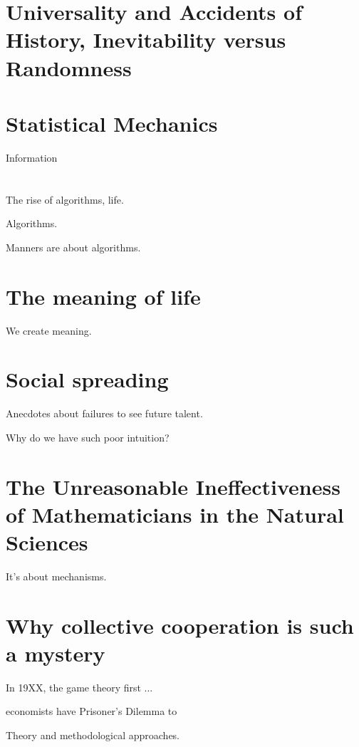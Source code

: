 \section{Universality and Accidents of History, Inevitability versus Randomness}

\section{Statistical Mechanics}


Information

\section{}

The rise of algorithms, life.

Algorithms.

Manners are about algorithms.

\section{The meaning of life}

We create meaning.


\section{Social spreading}

Anecdotes about failures to see future talent.

Why do we have such poor intuition?


\section{The Unreasonable Ineffectiveness of Mathematicians in the Natural Sciences}

It's about mechanisms.  

\cite{wigner1960a}

\section{Why collective cooperation is such a mystery}


In 19XX, the game theory first ...


economists 
have Prisoner's Dilemma to 


Theory and methodological approaches.

